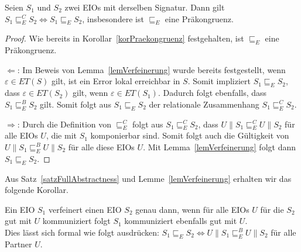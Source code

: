 \begin{satz}
  \label{satzFullAbstractness}
  Seien $S_1$ und $S_2$ zwei EIOs mit derselben Signatur. Dann gilt $S_1\sqsubseteq
  _E^C S_2\Leftrightarrow S_1\sqsubseteq _E S_2$, insbesondere ist $\sqsubseteq _E$
  eine Präkongruenz.
\end{satz}

\begin{proof}
  Wie bereits in Korollar~\ref{korPraekongruenz} festgehalten, ist $\sqsubseteq _E$ eine
  Präkongruenz.

  \glqq $\Leftarrow$\grqq : Im Beweis von Lemma~\ref{lemVerfeinerung} wurde
  bereits festgestellt, wenn
      $\varepsilon\in ET(S)$ gilt, ist ein Error lokal erreichbar in $S$.
      Somit impliziert $S_1\sqsubseteq _E S_2$, dass $\varepsilon\in
      ET(S_2)$ gilt, wenn $\varepsilon\in ET(S_1)$. Dadurch folgt ebenfalls,
      dass $S_1\sqsubseteq _E^B S_2$ gilt. Somit folgt aus $S_1\sqsubseteq
      _E S_2$ der relationale Zusammenhang $S_1\sqsubseteq _E^C S_2$.

  \glqq $\Rightarrow$\grqq : Durch die Definition von $\sqsubseteq _E^C$ folgt aus
  $S_1\sqsubseteq _E^C S_2$, dass $U\|S_1\sqsubseteq _E^C U\|S_2$ für alle EIOs $U$, die mit
  $S_1$ komponierbar sind. Somit folgt auch die Gültigkeit von
  $U\|S_1\sqsubseteq _E^B U\|S_2$ für alle diese EIOs $U$. Mit
  Lemma~\ref{lemVerfeinerung} folgt dann $S_1\sqsubseteq _E S_2$.
\end{proof}

Aus Satz~\ref{satzFullAbstractness} und Lemme~\ref{lemVerfeinerung} erhalten
wir das folgende Korollar.

\begin{kor}
  Ein EIO $S_1$ verfeinert einen EIO $S_2$ genau dann, wenn für alle EIOs $U$
  für die $S_2$ gut mit $U$ kommuniziert folgt $S_1$ kommuniziert
  ebenfalls gut mit $U$.\\
  Dies lässt sich formal wie folgt ausdrücken: $S_1\sqsubseteq _E S_2
  \Leftrightarrow U\|S_1\sqsubseteq _E^B U\|S_2$ für alle Partner $U$.
\end{kor}
